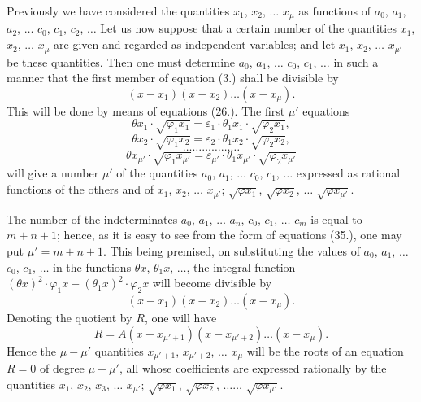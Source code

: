 \documentclass{article}
\begin{document}
Previously we have considered the quantities $x_1$, $x_2$, $\ldots$ $x_\mu$ as functions of $a_0$, $a_1$, $a_2$, $\ldots$ $c_0$, $c_1$, $c_2$, $\ldots$ Let us now suppose that a certain number of the quantities $x_1$, $x_2$, $\ldots$ $x_\mu$ are given and regarded as independent variables; and let $x_1$, $x_2$, $\ldots$ $x_{\mu'}$ be these quantities. Then one must determine $a_0$, $a_1$, $\ldots$ $c_0$, $c_1$, $\ldots$ in such a manner that the first member of equation (3.) shall be divisible by
\[ (x-x_1)(x-x_2)\ldots(x-x_\mu). \]
This will be done by means of equations (26.). The first $\mu'$ equations
\[ \theta x_1 \cdot \sqrt{\varphi_1 x_1} = \varepsilon_1 \cdot \theta_1 x_1 \cdot \sqrt{\varphi_2 x_1}, \]
\[ \theta x_2 \cdot \sqrt{\varphi_1 x_2} = \varepsilon_2 \cdot \theta_1 x_2 \cdot \sqrt{\varphi_2 x_2}, \]
\[ \ldots\ldots\ldots\ldots\ldots\ldots \]
\[ \theta x_{\mu'} \cdot \sqrt{\varphi_1 x_{\mu'}} = \varepsilon_{\mu'} \cdot \theta_1 x_{\mu'} \cdot \sqrt{\varphi_2 x_{\mu'}} \]
will give a number $\mu'$ of the quantities $a_0$, $a_1$, $\ldots$ $c_0$, $c_1$, $\ldots$ expressed as rational functions of the others and of $x_1$, $x_2$, $\ldots$ $x_{\mu'}$; $\sqrt{\varphi x_1}$, $\sqrt{\varphi x_2}$, $\ldots$ $\sqrt{\varphi x_{\mu'}}$.

The number of the indeterminates $a_0$, $a_1$, $\ldots$ $a_n$, $c_0$, $c_1$, $\ldots$ $c_m$ is equal to $m+n+1$; hence, as it is easy to see from the form of equations (35.), one may put $\mu' = m+n+1$. This being premised, on substituting the values of $a_0$, $a_1$, $\ldots$ $c_0$, $c_1$, $\ldots$ in the functions $\theta x$, $\theta_1 x$, $\ldots$, the integral function $(\theta x)^{2} \cdot \varphi_1 x - (\theta_1 x)^{2} \cdot \varphi_2 x$ will become divisible by
\[ (x-x_1)(x-x_2)\ldots(x-x_\mu). \]
Denoting the quotient by $R$, one will have
\[ R = A(x-x_{\mu'+1})(x-x_{\mu'+2})\ldots(x-x_\mu). \tag{36} \]
Hence the $\mu-\mu'$ quantities $x_{\mu'+1}$, $x_{\mu'+2}$, $\ldots$ $x_\mu$ will be the roots of an
equation $R = 0$ of degree $\mu-\mu'$, all whose coefficients are expressed rationally by the quantities $x_1$, $x_2$, $x_3$, $\ldots$ $x_{\mu'}$; $\sqrt{\varphi x_1}$, $\sqrt{\varphi x_2}$, $\ldots\ldots$ $\sqrt{\varphi x_{\mu'}}$.
\end{document}
